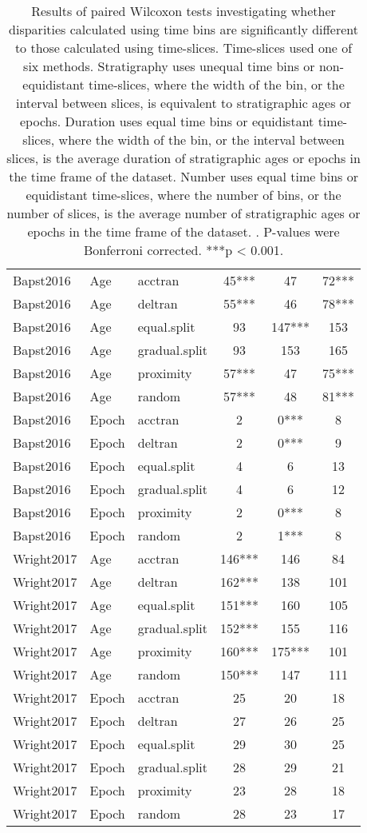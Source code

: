 \begin{table}[!htbp]
\begin{tabular}{lllccc}
  Bapst2016 & Age & acctran & 45*** & 47 & 72*** \\ 
  Bapst2016 & Age & deltran & 55*** & 46 & 78*** \\ 
  Bapst2016 & Age & equal.split & 93 & 147*** & 153 \\ 
  Bapst2016 & Age & gradual.split & 93 & 153 & 165 \\ 
  Bapst2016 & Age & proximity & 57*** & 47 & 75*** \\ 
  Bapst2016 & Age & random & 57*** & 48 & 81*** \\ 
  Bapst2016 & Epoch & acctran & 2 & 0*** & 8 \\ 
  Bapst2016 & Epoch & deltran & 2 & 0*** & 9 \\ 
  Bapst2016 & Epoch & equal.split & 4 & 6 & 13 \\ 
  Bapst2016 & Epoch & gradual.split & 4 & 6 & 12 \\ 
  Bapst2016 & Epoch & proximity & 2 & 0*** & 8 \\ 
  Bapst2016 & Epoch & random & 2 & 1*** & 8 \\ 
  Wright2017 & Age & acctran & 146*** & 146 & 84 \\ 
  Wright2017 & Age & deltran & 162*** & 138 & 101 \\ 
  Wright2017 & Age & equal.split & 151*** & 160 & 105 \\ 
  Wright2017 & Age & gradual.split & 152*** & 155 & 116 \\ 
  Wright2017 & Age & proximity & 160*** & 175*** & 101 \\ 
  Wright2017 & Age & random & 150*** & 147 & 111 \\ 
  Wright2017 & Epoch & acctran & 25 & 20 & 18 \\ 
  Wright2017 & Epoch & deltran & 27 & 26 & 25 \\ 
  Wright2017 & Epoch & equal.split & 29 & 30 & 25 \\ 
  Wright2017 & Epoch & gradual.split & 28 & 29 & 21 \\ 
  Wright2017 & Epoch & proximity & 23 & 28 & 18 \\ 
  Wright2017 & Epoch & random & 28 & 23 & 17 \\ 
   \hline
\end{tabular}
\caption{Results of paired Wilcoxon tests investigating whether disparities calculated using time bins are significantly different to those calculated using time-slices. Time-slices used one of six methods. Stratigraphy uses unequal time bins or non-equidistant time-slices, where the width of the bin, or the interval between slices, is equivalent to stratigraphic ages or epochs. Duration uses equal time bins or equidistant time-slices, where the width of the bin, or the interval between slices, is the average duration of stratigraphic ages or epochs in the time frame of the dataset. Number uses equal time bins or equidistant time-slices, where the number of bins, or the number of slices, is the average number of stratigraphic ages or epochs in the time frame of the dataset. . P-values were Bonferroni corrected. ***p < 0.001.} 
\end{table}
